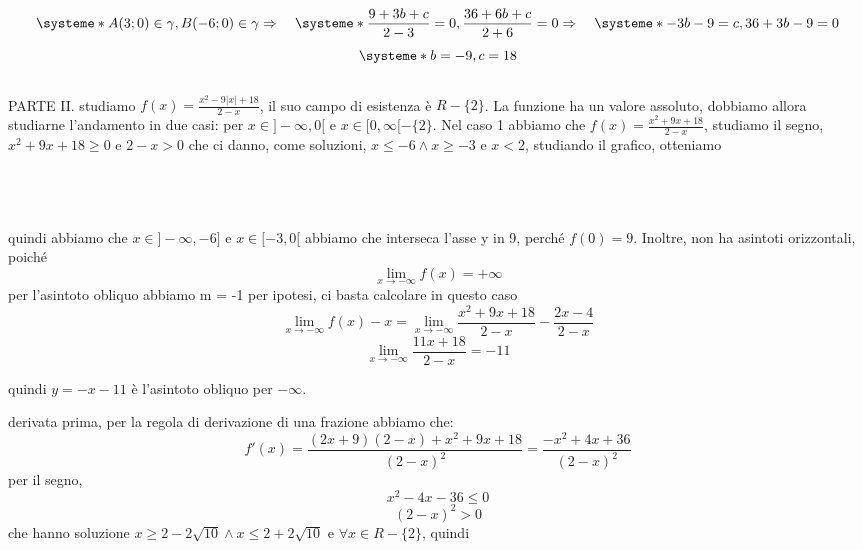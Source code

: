 \documentclass{article}
\begin{document}
\[
\systeme*{A(3;0) \in \gamma, B(-6;0)\in \gamma}  \Rightarrow \quad
\systeme*{\frac{9+3b+c}{2-3} = 0, \frac{36+6b+c}{2+6} = 0} \Rightarrow \quad
\systeme*{-3b -9 = c, 36 + 3b -9  = 0} 
\] 
\[
\systeme*{b = -9, c = 18} 
\]
\\
PARTE II.
studiamo
$f(x) = \frac{x^2 - 9|x| + 18}{2-x}$, il suo campo di esistenza è $R-\{2\}$. La funzione ha un valore assoluto, dobbiamo allora studiarne l'andamento in due casi: per $x \in ]-\infty, 0[$ e $x \in [0, \infty[ - \{2\}$.
Nel caso 1 abbiamo che $f(x) = \frac{x^2 + 9x + 18}{2-x}$, studiamo il segno, $x^2 + 9x + 18 \geq 0$ e $2-x > 0$
che ci danno, come soluzioni, $x \leq -6 \land x \geq -3$ e $x < 2$, studiando il grafico, otteniamo
\\\\
\\\\
quindi abbiamo che $x \in ]-\infty, -6]$ e $x \in [-3, 0[$
abbiamo che interseca l'asse y in 9, perché $f(0) = 9$.
Inoltre, non ha asintoti orizzontali, poiché
\[
\lim_{x \to -\infty} f(x) = +\infty
\]
per l'asintoto obliquo abbiamo m = -1 per ipotesi, ci basta calcolare in questo caso 
\[
\lim_{x\to-\infty} f(x)-x = \lim_{x\to-\infty}\frac{x^2 + 9x + 18}{2-x} - \frac{2x-4}{2-x}
\]
\[
\lim_{x\to-\infty}\frac{11x+18}{2-x} = -11
\]

quindi $y = -x - 11$ è l'asintoto obliquo per $-\infty$.

derivata prima, per la regola di derivazione di una frazione abbiamo che:
\[
f'(x) = \frac{(2x+9)(2-x)+x^2+9x+18}{(2-x)^2} = \frac{-x^2+4x+36}{(2-x)^2}
\]
per il segno,
\[
x^2-4x-36 \leq 0
\]
\[
(2-x)^2 > 0
\]
che hanno soluzione $x \geq 2-2\sqrt{10} \land x \leq 2+2\sqrt{10}$ e $\forall x \in R-\{2\}$, quindi
\\\\
\\\\
\end{document}
